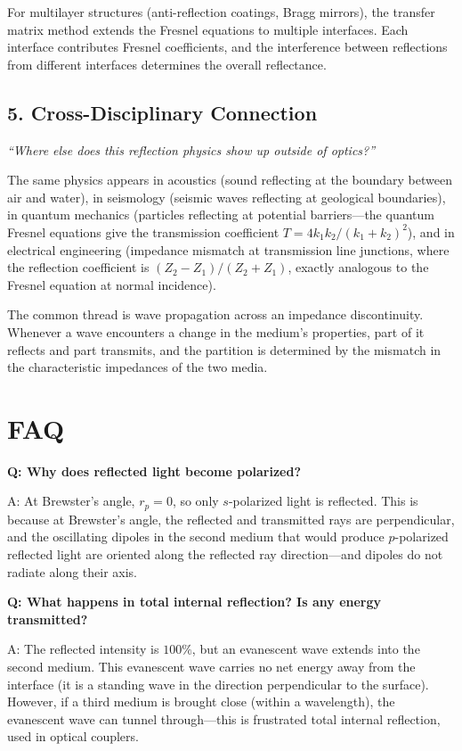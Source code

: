 \documentclass[11pt,openright]{book}
\begin{document}
For multilayer structures (anti-reflection coatings, Bragg mirrors), the transfer matrix method extends the Fresnel equations to multiple interfaces. Each interface contributes Fresnel coefficients, and the interference between reflections from different interfaces determines the overall reflectance.

\subsection*{5. Cross-Disciplinary Connection}
\textit{``Where else does this reflection physics show up outside of optics?''}

The same physics appears in acoustics (sound reflecting at the boundary between air and water), in seismology (seismic waves reflecting at geological boundaries), in quantum mechanics (particles reflecting at potential barriers---the quantum Fresnel equations give the transmission coefficient $T = 4k_1 k_2/(k_1 + k_2)^2$), and in electrical engineering (impedance mismatch at transmission line junctions, where the reflection coefficient is $(Z_2 - Z_1)/(Z_2 + Z_1)$, exactly analogous to the Fresnel equation at normal incidence).

The common thread is wave propagation across an impedance discontinuity. Whenever a wave encounters a change in the medium's properties, part of it reflects and part transmits, and the partition is determined by the mismatch in the characteristic impedances of the two media.

\section*{FAQ}

\textbf{Q: Why does reflected light become polarized?}

A: At Brewster's angle, $r_p = 0$, so only $s$-polarized light is reflected. This is because at Brewster's angle, the reflected and transmitted rays are perpendicular, and the oscillating dipoles in the second medium that would produce $p$-polarized reflected light are oriented along the reflected ray direction---and dipoles do not radiate along their axis.

\textbf{Q: What happens in total internal reflection? Is any energy transmitted?}

A: The reflected intensity is $100\%$, but an evanescent wave extends into the second medium. This evanescent wave carries no net energy away from the interface (it is a standing wave in the direction perpendicular to the surface). However, if a third medium is brought close (within a wavelength), the evanescent wave can tunnel through---this is frustrated total internal reflection, used in optical couplers.
\end{document}
